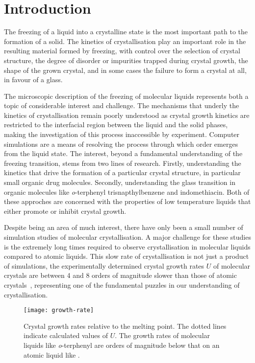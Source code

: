 \chapter {Introduction}

The freezing of a liquid into a crystalline state is the most important path to the formation of a solid. The kinetics of crystallisation play an important role in the resulting material formed by freezing, with control over the selection of crystal structure, the degree of disorder or impurities trapped during crystal growth, the shape of the grown crystal, and in some cases the failure to form a crystal at all, in favour of a glass.


The microscopic description of the freezing of molecular liquids represents both a topic of considerable interest and challenge. The mechanisms that underly the kinetics of crystallisation remain poorly understood as crystal growth kinetics are restricted to the interfacial region between the liquid and the solid phases, making the investigation of this process inaccessible by experiment. Computer simulations are a means of resolving the process through which order emerges from the liquid state. The interest, beyond a fundamental understanding of the freezing transition, stems from two lines of research. Firstly, understanding the kinetics that drive the formation of a particular crystal structure, in particular small organic drug molecules. Secondly, understanding the glass transition in organic molecules like \emph{o}-terphenyl trisnapthylbenzene and indomethiacin. Both of these approches are concerned with the properties of low temperature liquids that either promote or inhibit crystal growth.

Despite being an area of much interest, there have only been a small number of simulation studies of molecular crystallisation. A major challenge for these studies is the extremely long times required to observe crystallisation in molecular liquids compared to atomic liquids. This slow rate of crystallisation is not just a product of simulations, the experimentally determined crystal growth rates $U$ of molecular crystals are between 4 and 8 orders of magnitude slower than those of atomic crystals~, representing one of the fundamental puzzles in our understanding of crystallisation.

\begin{figure}
    \texttt{[image: growth-rate]}
    \caption{Crystal growth rates relative to the melting point. The dotted lines indicate calculated values of $U$. The growth rates of molecular liquids like {\em o}-terphenyl are orders of magnitude below that on an atomic liquid like .}
    \label{growth rate}
\end{figure}

